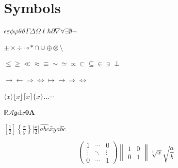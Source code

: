 \section{Symbols}

\(\epsilon\varepsilon\phi\varphi\theta\vartheta\Gamma\Delta\Omega\ell\hbar\partial\nabla\forall\exists\emptyset\neg\)

\(\pm\times\div\cdot\circ\ast\cap\cup\oplus\otimes\setminus\)

\(\leq \geq \ll \approx \equiv \sim \simeq \propto \subset \subseteq \in \ni \perp\)

\(\to \leftarrow \Rightarrow \Leftrightarrow \mapsto \longrightarrow \Longrightarrow \Longleftrightarrow\)

\(\langle x\rangle\lfloor x\rfloor\lceil x\rceil\{x\}\ldots\cdots\)

\(\mathbb{R}\mathcal{A}\mathfrak{g}\mathrm{d}x\boldsymbol{\theta}\mathbf{A}\)

\(\left[ \frac{1}{2} \right]\left\{ \frac{x}{y} \right\}\left| \frac{x}{2} \right|\widehat{abc}\widetilde{xy}\dot{a}\ddot{b}\tilde{c}\)

\[
\begin{pmatrix}
1 & \cdots & 0 \\
\vdots & \ddots & \vdots \\
0 & \cdots & 1
\end{pmatrix} \begin{Vmatrix}
1 & 0 \\
0 & 1
\end{Vmatrix} \sqrt[3]{x}\sqrt{\frac{a}{b}}
\]
